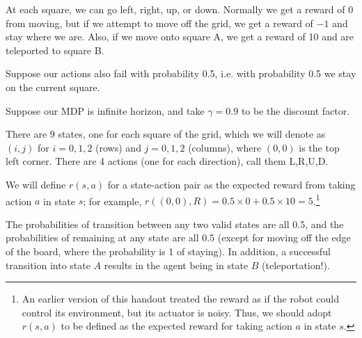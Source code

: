 \documentclass[12pt]{article}
\begin{document}
At each square, we can go left, right, up, or down. Normally we get a reward of 0 from moving, but if we attempt to move off the grid, we get a reward of $-1$ and stay where we are. Also, if we move onto square A, we get a reward of 10 and are teleported to square B.

Suppose our actions also fail with probability 0.5, i.e. with probability 0.5 we stay on the current square.

Suppose our MDP is infinite horizon, and take $\gamma = 0.9$ to be the discount factor.

\vspace{.5pc}

\noindent {}

\vspace{.5pc}

\begin{solution}
There are 9 states, one for each square of the grid, which we will denote as $(i,j)$ for $i=0,1,2$ (rows) and $j=0,1,2$ (columns), where $(0,0)$ is the top left corner. There are 4 actions (one for each direction), call them L,R,U,D.

We will define $r(s,a)$ for a state-action pair as the expected reward from taking action $a$ in state $s$; for example, $r((0,0), R) = 0.5 \times 0 + 0.5 \times 10 = 5$.\footnote{An earlier version of this handout treated the reward as if the robot could control its environment, but its actuator is noisy. Thus, we should adopt $r(s,a)$ to be defined as the expected reward for taking action
  $a$ in state $s$.}
%

The probabilities of transition between any two valid states are all 0.5, and the probabilities of remaining at any state are all 0.5 (except for moving off the edge of the board, where the probability is 1 of staying). In addition, a
successful transition into state $A$ results in the agent being in state $B$ (teleportation!).
\end{solution}

\vspace{.5pc}
\noindent {}
\end{document}
